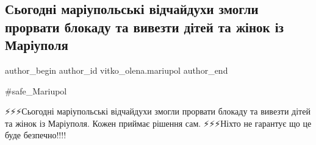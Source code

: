  
 
 
 
 

\subsection{Сьогодні маріупольські відчайдухи змогли прорвати блокаду та вивезти дітей та жінок із Маріуполя}
\label{sec:14_03_2022.fb.vitko_olena.mariupol.1.blokada_proryv}

\ifcmt
 author_begin
   author_id vitko_olena.mariupol
 author_end
\fi

\#safe\_Mariupol

⚡️⚡️⚡️Сьогодні маріупольські відчайдухи змогли прорвати блокаду та вивезти
дітей та жінок із Маріуполя. Кожен приймає рішення сам. ⚡️⚡️⚡️Ніхто не
гарантує що це буде безпечно!!!!
